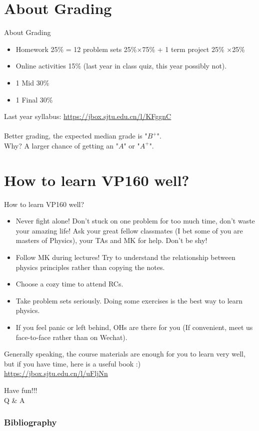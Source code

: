 \documentclass{beamer}
\begin{document}
\section{About Grading}
\begin{frame}{About Grading}
  \begin{itemize}
    \item Homework 25\% =  12 problem sets 25\%$\times $75\% + 1 term project 25\% $\times $25\%
    \item Online activities 15\% (last year in class quiz, this year possibly not).
    \item 1 Mid 30\%
    \item 1 Final 30\%
  \end{itemize}
    Last year syllabus: \underline{\small{\url{https://jbox.sjtu.edu.cn/l/KFggnC}}}\\
    ~\\
    Better grading, the expected median grade is "$B^+$".\\
    Why? A larger chance of getting an "$A$" or "$A^+$".
    \end{frame}

\section{How to learn VP160 well?}
\begin{frame}{How to learn VP160 well?}
    \begin{itemize}
      \item Never fight alone! Don't stuck on one problem for too much time, don't waste your amazing life! Ask your great fellow classmates (I bet some of you are masters of Physics), your TAs and MK for help. Don't be shy!
      \item Follow MK during lectures! Try to understand the relationship between physics principles rather than copying the notes.
      \item Choose a cozy time to attend RCs.
      \item Take problem sets seriously. Doing some exercises is the best way to learn physics.
      \item If you feel panic or left behind, OHs are there for you (If convenient, meet us face-to-face rather than on Wechat).
    \end{itemize}
\end{frame}

\begin{frame}
  Generally speaking, the course materials are enough for you to learn very well, but if you have time, here is a useful book :)\\
  \underline{\small{\url{https://jbox.sjtu.edu.cn/l/uFljNn}}}
\end{frame}
\begin{frame}
  \centering
  \huge{Have fun!!!}\\
  \huge{Q \& A}
\end{frame}
\renewcommand{\bibfont}{\footnotesize}
\frametitle{Bibliography}




\end{document}
